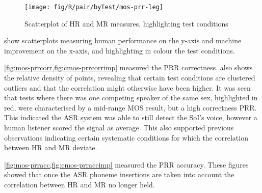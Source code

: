 \begin{figure}[h]


\noindent \begin{centering}
\texttt{[image: fig/R/pair/byTest/mos-prr-leg]}
\par\end{centering}

\protect\caption{\label{fig:hr-mr}Scatterplot of \acs{HR} and \acs{MR} measures,
highlighting test conditions}
\end{figure}


 show scatterplots measuring human performance on the
y-axis and machine improvement on the x-axis, and highlighting in
colour the test conditions.

\cref{fig:mos-prrcorr,fig:cmos-prrcorrimp} measured the \ac{PRR}
correctness.  also shows the relative density
of points, revealing that certain test conditions are clustered outliers
and that the correlation might otherwise have been higher. It was
seen that tests where there was one competing speaker of the same
sex, highlighted in red, were characterised by a mid-range \ac{MOS}
result, but a high correctness \ac{PRR}. This indicated the \ac{ASR}
system was able to still detect the \ac{SoI}'s voice, however a human
listener scored the signal as average. This also supported previous
observations indicating certain systematic conditions for which the
correlation between \ac{HR} and \ac{MR} deviate.

\cref{fig:mos-prracc,fig:cmos-prraccimp} measured the \ac{PRR} accuracy.
These figures showed that once the \ac{ASR} phoneme insertions are
taken into account the correlation between \ac{HR} and \ac{MR} no
longer held.

